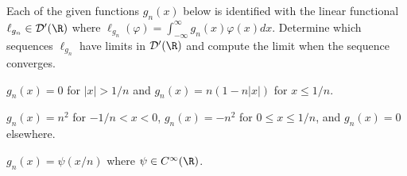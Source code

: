 Each of the given functions $g_n(x)$ below is identified with the
linear functional $\ell_{g_n}\in \mathcal{D}'(\R)$ where
$\ell_{g_n}(\varphi)=\int_{-\infty}^{\infty}g_n(x)\varphi(x)dx$.
Determine which sequences $\ell_{g_n}$ have limits in
$\mathcal{D}'(\R)$ and compute the limit when the sequence converges.
\begin{alist}
\item $g_n(x)=0$ for $|x|>1/n$ and $g_n(x)=n(1-n|x|)$ for $x\leq 1/n$.
\item $g_n(x)=n^2$ for $-1/n<x<0$,  $g_n(x)=-n^2$ for $0\leq x\leq 1/n$,
and $g_n(x)=0$ elsewhere.
\item $g_n(x)=\psi(x/n)$ where $\psi\in C^{\infty}(\R)$.
\end{alist}
